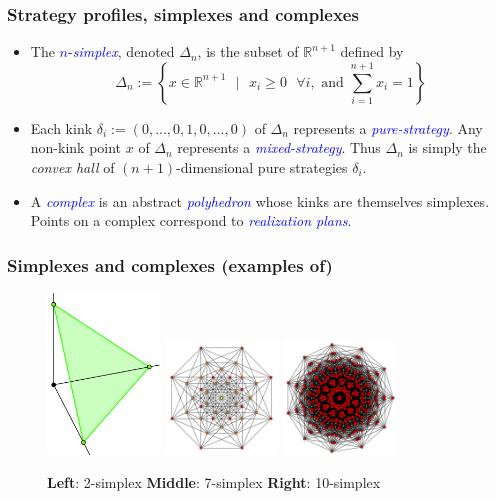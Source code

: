 \documentclass[xcolor=dvipsnames]{beamer}
\begin{document}
\begin{frame}
\frametitle{Strategy profiles, simplexes and complexes}
\begin{definition}
  \begin{itemize}[<+->]
    \item The \textcolor{blue}{$n$-\textit{simplex}}, denoted $\Delta_n$, is the subset of $\mathbb{R}^{n+1}$ defined by
      \begin{equation}
        \Delta_n := \left\{x \in \mathbb{R}^{n+1}\text{ }|\text{ } x_i \ge 0\text{ } \forall i, \text{ and } \sum_{i=1}^{n+1}{x_i} = 1\right\}
      \end{equation}
    \item Each kink $\delta_i := (0, ..., 0,1,0, ...,0)$ of $\Delta_n$ represents a \textit{\textcolor{blue}{pure-strategy}}.
      Any non-kink point $x$ of $\Delta_n$ represents a
      \textit{\textcolor{blue}{mixed-strategy}}. Thus $\Delta_n$ is simply the \textit{convex hall} of $(n+1)$-dimensional pure strategies $\delta_i$.
    \item A \textit{\textcolor{blue}{complex}} is an abstract \textit{\textcolor{blue}{polyhedron}} whose kinks are themselves simplexes. Points on
      a complex correspond to \textit{\textcolor{blue}{realization plans}}.
  \end{itemize}
\end{definition}
\end{frame}

\begin{frame}
\frametitle{Simplexes and complexes (examples of)}
\begin{figure}
  \includegraphics[width=3cm]{simplex.png}
  \includegraphics[width=3cm]{7-simplex.png}
  \includegraphics[width=3cm]{10-simplex.png}
  \caption{\textbf{Left}: 2-simplex \textbf{Middle}: 7-simplex \textbf{Right}: 10-simplex}
\end{figure}
\end{frame}
\end{document}
